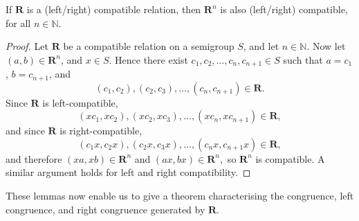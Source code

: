 \begin{lemma}
  \label{lem:compatn}
  If $\mathbf{R}$ is a (left/right) compatible relation, then $\mathbf{R}^n$ is
  also (left/right) compatible, for all $n \in \mathbb{N}$.
  \begin{proof}
    Let $\mathbf{R}$ be a compatible relation on a semigroup $S$,
    and let $n \in \mathbb{N}$.
    Now let $(a,b) \in \mathbf{R}^n$, and $x \in S$.  Hence there exist
    $c_1, c_2, \dots, c_n, c_{n+1} \in S$ such that $a=c_1$, $b=c_{n+1}$,
    and $$(c_1, c_2), (c_2, c_3), \dots, (c_n, c_{n+1}) \in \mathbf{R}.$$
    Since $\mathbf{R}$ is left-compatible,
    $$(xc_1, xc_2), (xc_2, xc_3), \dots, (xc_n, xc_{n+1}) \in \mathbf{R},$$
    and since $\mathbf{R}$ is right-compatible,
    $$(c_1x, c_2x), (c_2x, c_3x), \dots, (c_nx, c_{n+1}x) \in \mathbf{R},$$
    and therefore
    $(xa,xb) \in \mathbf{R}^n$ and $(ax, bx) \in \mathbf{R}^n,$
    so $\mathbf{R}^n$ is compatible. \cite[p.26]{howie}
    A similar argument holds for left and right compatibility.
  \end{proof}
\end{lemma}

These lemmas now enable us to give a theorem characterising the congruence, left
congruence, and right congruence generated by $\mathbf{R}$.

